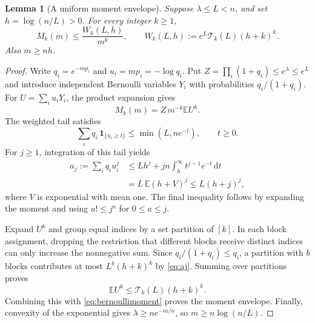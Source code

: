 \documentclass[11pt,a4paper]{article}
\newtheorem{lemma}[theorem]{Lemma}
\theoremstyle{definition}
\newcommand{\E}{\mathbb E}
\newcommand{\dd}{\,\mathrm d}
\begin{document}
\begin{lemma}[A uniform moment envelope]\label{lem:moment}
Suppose $\lambda\le L<n$, and set $h=\log(n/L)>0$. For every integer
$k\ge1$,
\begin{equation}\label{eq:momentenvelope}
 M_k(m)\le \frac{W_k(L,h)}{m^k},
 \qquad W_k(L,h):=e^L\mathcal T_k(L)(h+k)^k.
\end{equation}
Also $m\ge nh$.
\end{lemma}
\begin{proof}
Write $q_i=e^{-mp_i}$ and $u_i=mp_i=-\log q_i$. Put
$Z=\prod_i(1+q_i)\le e^\lambda\le e^L$ and introduce independent
Bernoulli variables $Y_i$ with probabilities $q_i/(1+q_i)$.
For $U=\sum_i u_iY_i$, the product expansion gives
\begin{equation}\label{eq:bernoullimoment}
 M_k(m)=Z\,m^{-k}\E U^k.
\end{equation}
The weighted tail satisfies
\begin{equation}\label{eq:weightedtail}
 \sum_i q_i\,\mathbf1_{\{u_i\ge t\}}\le\min(L,ne^{-t}),\qquad t\ge0.
\end{equation}
For $j\ge1$, integration of this tail yields
\begin{align}
 a_j:=\sum_iq_i u_i^j
 &\le Lh^j+jn\int_h^\infty t^{j-1}e^{-t}\dd t \nonumber\\
 &=L\,\E(h+V)^j
 \le L(h+j)^j, \label{eq:aj}
\end{align}
where $V$ is exponential with mean one. The final inequality follows by
expanding the moment and using $a!\le j^a$ for $0\le a\le j$.

Expand $U^k$ and group equal indices by a set partition of $[k]$.
In each block assignment, dropping the restriction that different blocks
receive distinct indices can only increase the nonnegative sum. Since
$q_i/(1+q_i)\le q_i$, a partition with $b$ blocks contributes at most
$L^b(h+k)^k$ by \eqref{eq:aj}. Summing over partitions proves
\[
 \E U^k\le \mathcal T_k(L)(h+k)^k.
\]
Combining this with \eqref{eq:bernoullimoment} proves the moment envelope.
Finally, convexity of the exponential gives
$\lambda\ge ne^{-m/n}$, so $m\ge n\log(n/L)$.
\end{proof}
\end{document}

